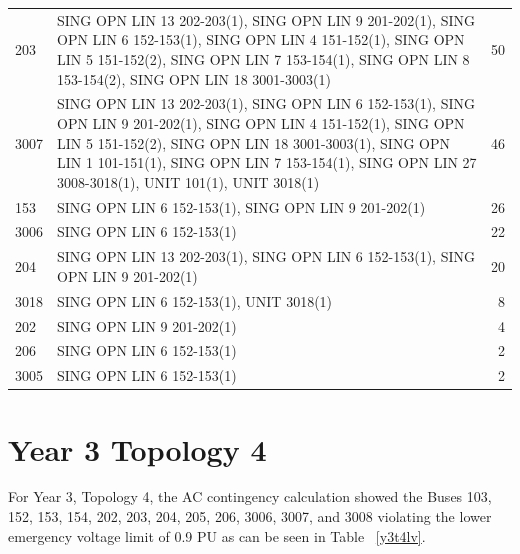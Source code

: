 \documentclass[10pt]{report}
\begin{document}
\begin{table}[H]
{\begin{tabular}{lp{18cm}r}
203 & SING OPN LIN   13 202-203(1), SING OPN LIN   9 201-202(1), SING OPN LIN   6 152-153(1), SING OPN LIN   4 151-152(1), SING OPN LIN   5 151-152(2), SING OPN LIN   7 153-154(1), SING OPN LIN   8 153-154(2), SING OPN LIN   18 3001-3003(1) & 50 \\

3007 & SING OPN LIN   13 202-203(1), SING OPN LIN   6 152-153(1), SING OPN LIN   9 201-202(1), SING OPN LIN   4 151-152(1), SING OPN LIN   5 151-152(2), SING OPN LIN   18 3001-3003(1), SING OPN LIN   1 101-151(1), SING OPN LIN   7 153-154(1), SING OPN LIN   27 3008-3018(1), UNIT 101(1), UNIT 3018(1) & 46 \\

153 & SING OPN LIN   6 152-153(1), SING OPN LIN   9 201-202(1) & 26 \\

3006 & SING OPN LIN   6 152-153(1) & 22 \\

204 & SING OPN LIN   13 202-203(1), SING OPN LIN   6 152-153(1), SING OPN LIN   9 201-202(1) & 20 \\

3018 & SING OPN LIN   6 152-153(1), UNIT 3018(1) & 8 \\

202 & SING OPN LIN   9 201-202(1) & 4 \\

206 & SING OPN LIN   6 152-153(1) & 2 \\

3005 & SING OPN LIN   6 152-153(1) & 2 \\


\bottomrule
\end{tabular}}
\end{table}

\section{Year 3 Topology 4}

For Year 3, Topology 4, the AC contingency calculation showed the Buses 103, 152, 153, 154, 202, 203, 204, 205, 206, 3006, 3007, and 3008 violating the lower emergency voltage limit of 0.9 PU as can be seen in Table ~\ref{y3t4lv}.
\end{document}
